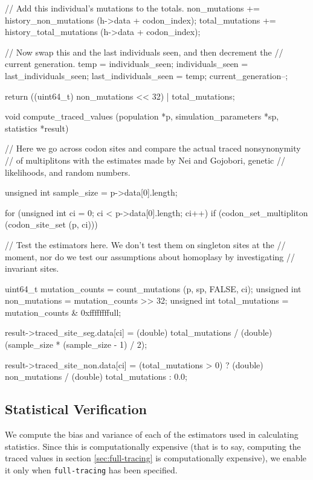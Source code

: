 \documentclass{article}
\begin{document}
\begin{ccode}
{{{        // Add this individual's mutations to the totals.
        non_mutations += history_non_mutations (h->data + codon_index);
        total_mutations += history_total_mutations (h->data + codon_index);
      }

    // Now swap this and the last individuals seen, and then decrement the
    // current generation.
    temp = individuals_seen;
    individuals_seen = last_individuals_seen;
    last_individuals_seen = temp;
    current_generation--;
  }

  return ((uint64_t) non_mutations << 32) | total_mutations;
}

void compute_traced_values (population *p, simulation_parameters *sp, statistics *result) {
  // Here we go across codon sites and compare the actual traced nonsynonymity
  // of multiplitons with the estimates made by Nei and Gojobori, genetic
  // likelihoods, and random numbers.

  unsigned int sample_size = p->data[0].length;

  for (unsigned int ci = 0; ci < p->data[0].length; ci++)
    if (codon_set_multipliton (codon_site_set (p, ci))) {
      // Test the estimators here. We don't test them on singleton sites at the
      // moment, nor do we test our assumptions about homoplasy by investigating
      // invariant sites.

      uint64_t		mutation_counts = count_mutations (p, sp, FALSE, ci);
      unsigned int	non_mutations   = mutation_counts >> 32;
      unsigned int	total_mutations = mutation_counts & 0xffffffffull;

      result->traced_site_seg.data[ci] = (double) total_mutations /
					 (double) (sample_size * (sample_size - 1) / 2);

      result->traced_site_non.data[ci] = (total_mutations > 0) ?
					   (double) non_mutations / (double) total_mutations :
					   0.0;
    }
}
\end{ccode}

    \subsection{Statistical Verification}
      \label{sec:statistical-verification}

      We compute the bias and variance of each of the estimators used in
      calculating statistics. Since this is computationally expensive (that is
      to say, computing the traced values in section \ref{sec:full-tracing} is
      computationally expensive), we enable it only when \verb|full-tracing| has
      been specified.
\end{document}

